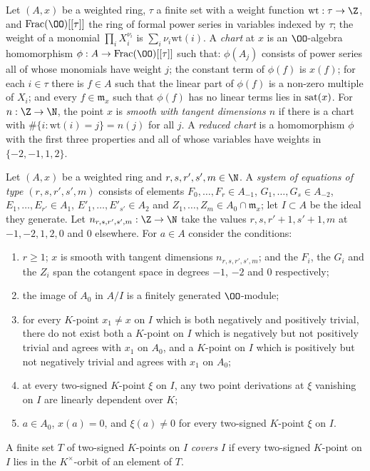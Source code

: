 \begin{definition}\label{pf:vwin-he:chart}
Let $(A,x)$ be a weighted ring, $\tau$ a finite set with a weight function $\mathrm{wt}:\tau\to\Z$, and
$\mathrm{Frac}(\OO)[[\tau]]$ the ring of formal power series in variables indexed by $\tau$; the weight of a monomial
$\prod_iX_i^{\nu_i}$ is $\sum_i\nu_i\mathrm{wt}(i)$. A \emph{chart} at $x$ is an $\OO$-algebra homomorphism
$\phi:A\to\mathrm{Frac}(\OO)[[\tau]]$ such that: $\phi(A_j)$ consists of power series all of whose monomials have
weight $j$; the constant term of $\phi(f)$ is $x(f)$; for each $i\in\tau$ there is $f\in A$ such that the linear
part of $\phi(f)$ is a non-zero multiple of $X_i$; and every $f\in\mathfrak m_x$ such that $\phi(f)$ has no linear
terms lies in $\operatorname{sat}(x)$. For $n:\Z\to\N$, the point $x$ is \emph{smooth with tangent dimensions $n$} if there
is a chart with $\#\{i:\mathrm{wt}(i)=j\}=n(j)$ for all $j$. A \emph{reduced chart} is a homomorphism $\phi$ with the
first three properties and all of whose variables have weights in $\{-2,-1,1,2\}$.
\end{definition}

\begin{definition}\label{pf:vwin-he:eqns}
Let $(A,x)$ be a weighted ring and $r,s,r',s',m\in\N$. A \emph{system of equations of type $(r,s,r',s',m)$} consists
of elements $F_0,\dots,F_r\in A_{-1}$, $G_1,\dots,G_s\in A_{-2}$, $E_1,\dots,E_{r'}\in A_1$,
$E'_1,\dots,E'_{s'}\in A_2$ and $Z_1,\dots,Z_m\in A_0\cap\mathfrak m_x$; let $I\subset A$ be the ideal they
generate. Let $n_{r,s,r',s',m}:\Z\to\N$ take the values $r,s,r'+1,s'+1,m$ at $-1,-2,1,2,0$ and $0$ elsewhere. For
$a\in A$ consider the conditions:
\begin{enumerate}[label=(M\arabic*)]
\item $r\ge1$; $x$ is smooth with tangent dimensions $n_{r,s,r',s',m}$; and the $F_i$, the $G_i$ and the $Z_i$
span the cotangent space in degrees $-1$, $-2$ and $0$ respectively;
\item the image of $A_0$ in $A/I$ is a finitely generated $\OO$-module;
\item for every $K$-point $x_1\ne x$ on $I$ which is both negatively and positively trivial, there do not exist both a
$K$-point on $I$ which is negatively but not positively trivial and agrees with $x_1$ on $A_0$, and a $K$-point on
$I$ which is positively but not negatively trivial and agrees with $x_1$ on $A_0$;
\item at every two-signed $K$-point $\xi$ on $I$, any two point derivations at $\xi$ vanishing on $I$ are linearly
dependent over $K$;
\item $a\in A_0$, $x(a)=0$, and $\xi(a)\ne0$ for every two-signed $K$-point $\xi$ on $I$.
\end{enumerate}
A finite set $T$ of two-signed $K$-points on $I$ \emph{covers} $I$ if every two-signed $K$-point on $I$ lies in the
$K^\times$-orbit of an element of $T$.
\end{definition}

